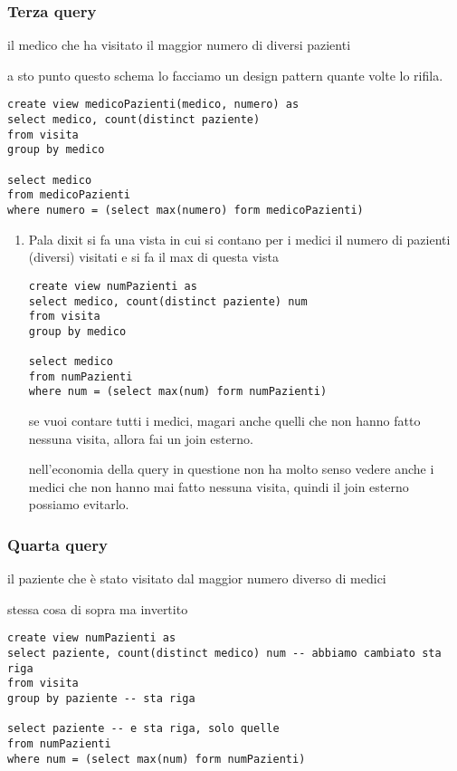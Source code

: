 \documentclass[11pt]{article}
\begin{document}
\subsubsection{Terza query}
\label{sec:org8250404}
il medico che ha visitato il maggior numero di diversi pazienti

a sto punto questo schema lo facciamo un design pattern quante volte lo rifila.
\begin{verbatim}
create view medicoPazienti(medico, numero) as
select medico, count(distinct paziente)
from visita
group by medico

select medico
from medicoPazienti
where numero = (select max(numero) form medicoPazienti)
\end{verbatim}

\begin{enumerate}
\item Pala dixit
\label{sec:org554db4f}
si fa una vista in cui si contano per i medici il numero di pazienti (diversi) visitati e
si fa il max di questa vista

\begin{verbatim}
create view numPazienti as
select medico, count(distinct paziente) num
from visita
group by medico

select medico
from numPazienti
where num = (select max(num) form numPazienti)
\end{verbatim}

se vuoi contare tutti i medici, magari anche quelli che non hanno fatto nessuna visita,
allora fai un join esterno.

nell'economia della query in questione non ha molto senso vedere anche i medici che non
hanno mai fatto nessuna visita, quindi il join esterno possiamo evitarlo.
\end{enumerate}

\subsubsection{Quarta query}
\label{sec:orgaf01ec0}
il paziente che è stato visitato dal maggior numero diverso di medici

stessa cosa di sopra ma invertito
\begin{verbatim}
create view numPazienti as
select paziente, count(distinct medico) num -- abbiamo cambiato sta riga
from visita
group by paziente -- sta riga

select paziente -- e sta riga, solo quelle
from numPazienti
where num = (select max(num) form numPazienti)
\end{verbatim}
\end{document}
